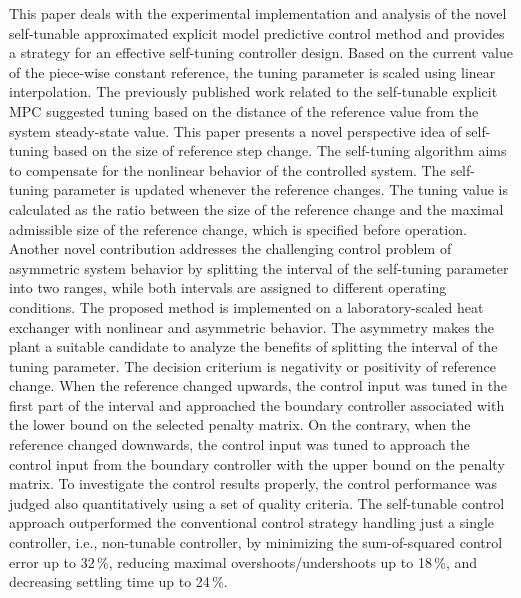 \documentclass[preprint,12pt]{elsarticle}
\begin{document}
		This paper deals with the experimental implementation and analysis of the novel self-tunable approximated explicit model predictive control method and provides a strategy for an effective self-tuning controller design. Based on the current value of the piece-wise constant reference, the tuning parameter is scaled using linear interpolation. 
	The previously published work related to the self-tunable explicit MPC suggested tuning based on the distance of the reference value from the system steady-state value. This paper presents a novel perspective idea of self-tuning based on the size of reference step change. The self-tuning algorithm aims to compensate for the nonlinear behavior of the controlled system. The self-tuning parameter is updated whenever the reference changes. The tuning value is calculated as the ratio between the size of the reference change and the maximal admissible size of the reference change, which is specified before operation. 
	Another novel contribution addresses the challenging control problem of asymmetric system behavior by splitting the interval of the self-tuning parameter into two ranges, while both intervals are assigned to different operating conditions. The proposed method is implemented on a laboratory-scaled heat exchanger with nonlinear and asymmetric behavior. The asymmetry makes the plant a suitable candidate to analyze the benefits of splitting the interval of the tuning parameter. The decision criterium is negativity or positivity of reference change. When the reference changed upwards, the control input was tuned in the first part of the interval and approached the boundary controller associated with the lower bound on the selected penalty matrix. On the contrary, when the reference changed downwards, the control input was tuned to approach the control input from the boundary controller with the upper bound on the penalty matrix. To investigate the control results properly, the control performance was judged also quantitatively using a set of quality criteria. The self-tunable control approach outperformed the conventional control strategy handling just a single controller, i.e., non-tunable controller, by minimizing the sum-of-squared control error up to 32\,\%, reducing maximal overshoots/undershoots up to 18\,\%, and decreasing settling time up to 24\,\%. %
	
\end{document}
